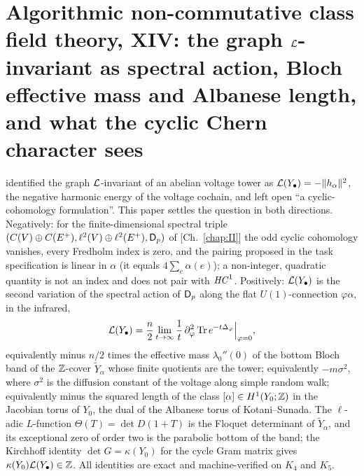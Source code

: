 \chapter[\texorpdfstring{XIV. The graph $\cL$-invariant as spectral action, Bloch effective mass and Albanese length, and what the cyclic Chern character sees}{XIV. The graph L-invariant as spectral action, Bloch effective mass and Albanese length, and what the cyclic Chern character sees}]{\texorpdfstring{Algorithmic non-commutative class field theory, XIV: the graph $\cL$-invariant as spectral action, Bloch effective mass and Albanese length, and what the cyclic Chern character sees}{Algorithmic non-commutative class field theory, XIV: the graph L-invariant as spectral action, Bloch effective mass and Albanese length, and what the cyclic Chern character sees}}\label{chap:XIV}
\begin{chapterabstract}
 identified the graph $\cL$-invariant of an abelian voltage tower as
$\mathcal{L}(Y_\bullet)=-\|h_\alpha\|^{2}$, the negative harmonic energy of the voltage cochain, and
left open ``a cyclic-cohomology formulation''. This paper settles the question in both
directions. Negatively: for the finite-dimensional spectral triple
$(C(V)\oplus C(E^{+}),\ell^{2}(V)\oplus\ell^{2}(E^{+}),\mathsf{D}_p)$ of [Ch.~\ref{chap:II}] the odd cyclic
cohomology vanishes, every Fredholm index is zero, and the pairing proposed in the task
specification is linear in $\alpha$ (it equals $4\sum_e\alpha(e)$); a non-integer, quadratic
quantity is not an index and does not pair with $\mathit{HC}^{1}$. Positively: $\mathcal{L}(Y_\bullet)$ is
the second variation of the spectral action of $\mathsf{D}_p$ along the flat $U(1)$-connection
$\varphi\alpha$, in the infrared,
\[
\mathcal{L}(Y_\bullet)=\frac n2\lim_{t\to\infty}\frac1t\,\partial_\varphi^{2}\operatorname{Tr} e^{-t\Delta_\varphi}\Big|_{\varphi=0},
\]
equivalently minus $n/2$ times the effective mass $\lambda_0''(0)$ of the bottom Bloch band
of the $\mathbb{Z}$-cover $\widetilde Y_\alpha$ whose finite quotients are the tower; equivalently
$-m\sigma^{2}$, where $\sigma^{2}$ is the diffusion constant of the voltage along simple
random walk; equivalently minus the squared length of the class $[\alpha]\in H^{1}(Y_0;\mathbb{Z})$
in the Jacobian torus of $Y_0$, the dual of the Albanese torus of Kotani--Sunada. The
$\ell$-adic $L$-function $\Theta(T)=\det D(1+T)$ is the Floquet determinant of
$\widetilde Y_\alpha$, and its exceptional zero of order two is the parabolic bottom of the
band; the Kirchhoff identity $\det G=\kappa(Y_0)$ for the cycle Gram matrix gives
$\kappa(Y_0)\mathcal{L}(Y_\bullet)\in\mathbb{Z}$. All identities are exact and machine-verified on $K_4$
and $K_5$.
\end{chapterabstract}

